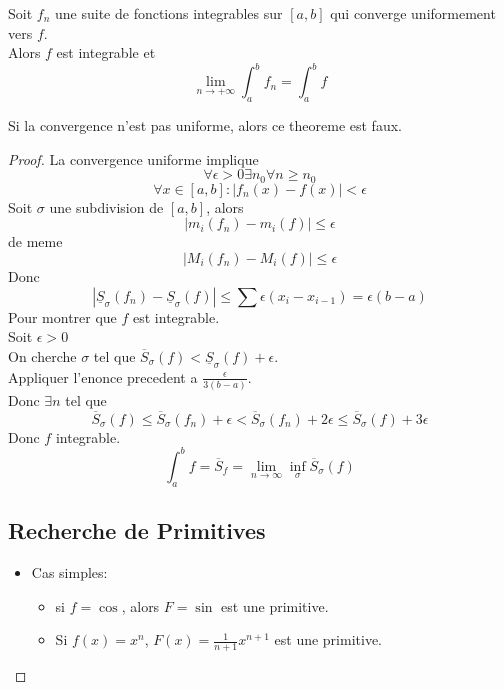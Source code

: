 \documentclass[../main.tex]{subfiles}
\begin{document}
\begin{thm}
	Soit $f_n$ une suite de fonctions integrables sur $[a,b]$ qui converge uniformement vers $f$.\\
	Alors $f$ est integrable et 
	\[ 
	\lim_{n \to  + \infty} \int_{ a }^{ b }f_n = \int_{ a }^{ b }f
	\]
\end{thm}
Si la convergence n'est pas uniforme, alors ce theoreme est faux.\\

\begin{proof}
La convergence uniforme implique
\[ 
\forall \epsilon> 0 \exists n_0 \forall n \geq n_0
\]
\[ 
	\forall x \in [ a,b] : | f_n( x) -f( x) | < \epsilon
\]
Soit $\sigma$ une subdivision de $[a,b]$, alors
\[ 
	|m_i( f_n) - m_i( f) |\leq \epsilon
\]
de meme
\[ 
	|M_i( f_n) - M_i( f) |\leq \epsilon
\]
Donc
\[ 
	|\underline{S}_\sigma( f_n)  - \underline{S}_\sigma( f) | \leq \sum \epsilon ( x_i - x_{i-1} ) =\epsilon ( b-a) 
\]
Pour montrer que $f$ est integrable.\\
Soit $\epsilon>0$\\
On cherche $\sigma$ tel que $\overline{S}_\sigma( f) < \underline{S}_\sigma( f) +\epsilon$.\\
Appliquer l'enonce precedent a $\frac{\epsilon}{3( b-a )}$.\\
Donc $\exists n$ tel que 
\[ 
	\overline{S}_\sigma( f) \leq \overline{S}_\sigma( f_n) +\epsilon< \overline{S}_\sigma( f_n)  + 2\epsilon \leq \overline{S}_\sigma( f) + 3\epsilon
\]
Donc $f$ integrable.\\
\[ 
	\int_{ a }^{ b } f = \overline{S}_f = \lim_{n \to \infty }  \inf_\sigma \overline{S}_\sigma( f) 
\]
\subsection{Recherche de Primitives}
\begin{itemize}
\item Cas simples:
\begin{itemize}
\item si $f= \cos$, alors $F= \sin$ est une primitive.
\item Si $f( x) = x^{n}$, $F( x) = \frac{1}{n+1}x^{n+1}$ est une primitive.
\end{itemize}
\end{itemize}



\end{proof}
\end{document}
